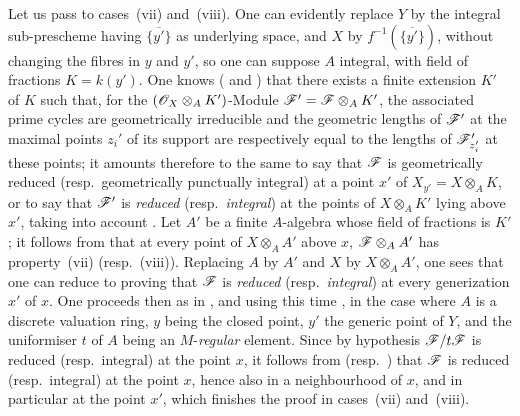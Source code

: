 \begin{env}[12.1.1.3]
\label{IV.12.1.1.3}
Let us pass to cases~(vii) and~(viii).
One can evidently replace $Y$ by the integral sub-prescheme having $\overline{\{y'\}}$ as underlying space, and $X$ by $f^{-1}(\overline{\{y'\}})$, without changing the fibres in $y$ and $y'$, so one can suppose $A$ integral, with field of fractions $K=k(y')$.
One knows ( and ) that there exists a finite extension $K'$ of $K$ such that, for the $(\mathscr{O}_X\otimes_A K')$-Module $\mathscr{F}'=\mathscr{F}\otimes_A K'$, the associated prime cycles are geometrically irreducible and the geometric lengths of $\mathscr{F}'$ at the maximal points $z_i'$ of its support are respectively equal to the lengths of $\mathscr{F}'_{z_i'}$ at these points; it amounts therefore to the same to say that $\mathscr{F}$ is geometrically reduced (resp.\ geometrically punctually integral) at a point $x'$ of $X_{y'}=X\otimes_A K$, or to say that $\mathscr{F}'$ is \emph{reduced} (resp.\ \emph{integral}) at the points of $X\otimes_A K'$ lying above $x'$, taking into account .
Let $A'$ be a finite $A$-algebra whose field of fractions is $K'$; it follows from  that at every point of $X\otimes_A A'$ above $x$, $\mathscr{F}\otimes_A A'$ has property~(vii) (resp.~(viii)).
Replacing $A$ by $A'$ and $X$ by $X\otimes_A A'$, one sees that one can reduce to proving that $\mathscr{F}$ is \emph{reduced} (resp.\ \emph{integral}) at every generization $x'$ of $x$.
One proceeds then as in , and using this time , in the case where $A$ is a discrete valuation ring, $y$ being the closed point, $y'$ the generic point of $Y$, and the uniformiser $t$ of $A$ being an $M$-\emph{regular} element.
Since by hypothesis $\mathscr{F}/t\mathscr{F}$ is reduced (resp.\ integral) at the point $x$, it follows from  (resp.\ ) that $\mathscr{F}$ is reduced (resp.\ integral) at the point $x$, hence also in a neighbourhood of $x$, and in particular at the point $x'$, which finishes the proof in cases~(vii) and~(viii).
\end{env}

